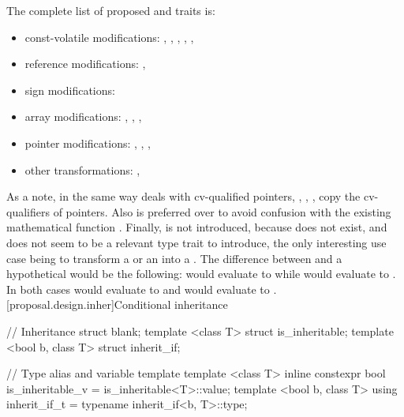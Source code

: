 \documentclass[ebook,10pt,oneside,openany,final]{memoir}
\begin{document}
The complete list of proposed  and  traits is:
\begin{itemize}
\item const-volatile modifications: , , , , , 
\item reference modifications: , 
\item sign modifications: 
\item array modifications: , , , 
\item pointer modifications: , , , 
\item other transformations: , 
\end{itemize}

As a note, in the same way  deals with cv-qualified pointers, , , ,  copy the cv-qualifiers of pointers. Also  is preferred over  to avoid confusion with the existing mathematical function . Finally,  is not introduced, because  does not exist, and does not seem to be a relevant type trait to introduce, the only interesting use case being to transform a  or an  into a . The difference between  and a hypothetical  would be the following:  would evaluate to  while  would evaluate to . In both cases  would evaluate to  and  would evaluate to .
[proposal.design.inher]{Conditional inheritance}

\begin{codeblock}
// Inheritance
struct blank;
template <class T> struct is_inheritable;
template <bool b, class T> struct inherit_if;

// Type alias and variable template
template <class T> inline constexpr bool is_inheritable_v = is_inheritable<T>::value;
template <bool b, class T> using inherit_if_t = typename inherit_if<b, T>::type;
\end{codeblock}
\end{document}
